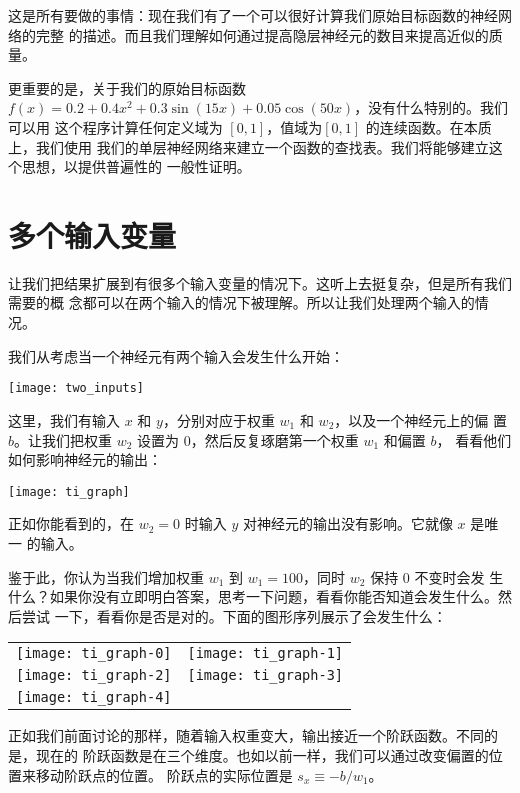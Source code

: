 这是所有要做的事情：现在我们有了一个可以很好计算我们原始目标函数的神经网络的完整
的描述。而且我们理解如何通过提高隐层神经元的数目来提高近似的质量。

更重要的是，关于我们的原始目标函数
$f(x) = 0.2+0.4 x^2+0.3 \sin(15 x) + 0.05 \cos(50 x)$，没有什么特别的。我们可以用
这个程序计算任何定义域为 $[0, 1]$，值域为$[0, 1]$ 的连续函数。在本质上，我们使用
我们的单层神经网络来建立一个函数的查找表。我们将能够建立这个思想，以提供普遍性的
一般性证明。

\section{多个输入变量}
\label{sec:many_input_variables}

让我们把结果扩展到有很多个输入变量的情况下。这听上去挺复杂，但是所有我们需要的概
念都可以在两个输入的情况下被理解。所以让我们处理两个输入的情况。

我们从考虑当一个神经元有两个输入会发生什么开始：
\begin{center}
  \texttt{[image: two\_inputs]}
\end{center}

这里，我们有输入 $x$ 和 $y$，分别对应于权重 $w_1$ 和 $w_2$，以及一个神经元上的偏
置 $b$。让我们把权重 $w_2$ 设置为 $0$，然后反复琢磨第一个权重 $w_1$ 和偏置 $b$，
看看他们如何影响神经元的输出：
\begin{center}
  \texttt{[image: ti\_graph]}
\end{center}

正如你能看到的，在 $w_2 = 0$ 时输入 $y$ 对神经元的输出没有影响。它就像 $x$ 是唯一
的输入。

鉴于此，你认为当我们增加权重 $w_1$ 到 $w_1 = 100$，同时 $w_2$ 保持 $0$ 不变时会发
生什么？如果你没有立即明白答案，思考一下问题，看看你能否知道会发生什么。然后尝试
一下，看看你是否是对的。下面的图形序列展示了会发生什么：
\begin{center}
  \begin{tabular}{c c}
  \texttt{[image: ti\_graph-0]} & \texttt{[image: ti\_graph-1]}\\
  \texttt{[image: ti\_graph-2]} & \texttt{[image: ti\_graph-3]}\\
  \texttt{[image: ti\_graph-4]} & \\
  \end{tabular}
\end{center}

正如我们前面讨论的那样，随着输入权重变大，输出接近一个阶跃函数。不同的是，现在的
阶跃函数是在三个维度。也如以前一样，我们可以通过改变偏置的位置来移动阶跃点的位置。
阶跃点的实际位置是 $s_x \equiv -b / w_1$。

